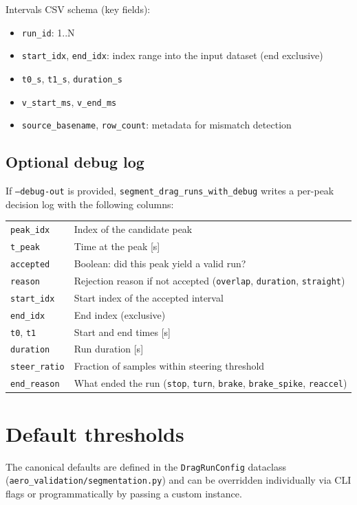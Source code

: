 \documentclass[11pt,a4paper]{article}
\begin{document}
Intervals CSV schema (key fields):
\begin{itemize}
  \item \texttt{run\_id}: 1..N
  \item \texttt{start\_idx}, \texttt{end\_idx}: index range into the input dataset (end exclusive)
  \item \texttt{t0\_s}, \texttt{t1\_s}, \texttt{duration\_s}
  \item \texttt{v\_start\_ms}, \texttt{v\_end\_ms}
  \item \texttt{source\_basename}, \texttt{row\_count}: metadata for mismatch detection
\end{itemize}

\subsection*{Optional debug log}
If \texttt{--debug-out} is provided, \texttt{segment\_drag\_runs\_with\_debug}
writes a per-peak decision log with the following columns:
\begin{center}
\begin{tabular}{ll}
\texttt{peak\_idx}     & Index of the candidate peak \\
\texttt{t\_peak}       & Time at the peak [s] \\
\texttt{accepted}      & Boolean: did this peak yield a valid run? \\
\texttt{reason}        & Rejection reason if not accepted
                         (\texttt{overlap}, \texttt{duration}, \texttt{straight}) \\
\texttt{start\_idx}    & Start index of the accepted interval \\
\texttt{end\_idx}      & End index (exclusive) \\
\texttt{t0}, \texttt{t1} & Start and end times [s] \\
\texttt{duration}      & Run duration [s] \\
\texttt{steer\_ratio}  & Fraction of samples within steering threshold \\
\texttt{end\_reason}   & What ended the run
                         (\texttt{stop}, \texttt{turn}, \texttt{brake},
                          \texttt{brake\_spike}, \texttt{reaccel}) \\
\end{tabular}
\end{center}

\section{Default thresholds}
\label{sec:thresholds}
The canonical defaults are defined in the \texttt{DragRunConfig} dataclass
(\texttt{aero\_validation/segmentation.py}) and can be overridden individually
via CLI flags or programmatically by passing a custom instance.
\end{document}
